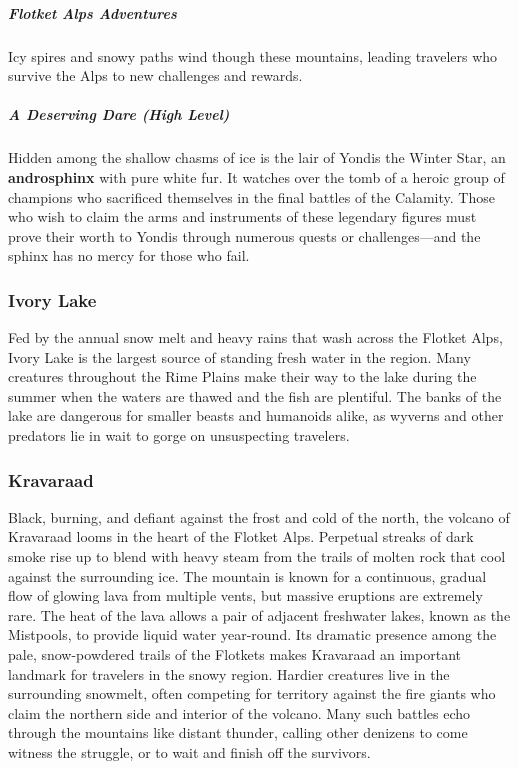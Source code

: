 \documentclass[10pt,a4paper,twoside,bg=print,twocolumn,openany,nodeprecatedcode]{dndbook}
\begin{document}
\subparagraph{Flotket Alps Adventures}
Icy spires and snowy paths wind though these mountains, leading travelers who survive the Alps to new challenges and rewards.

\subparagraph{A Deserving Dare (High Level)}
Hidden among the shallow chasms of ice is the lair of Yondis the Winter Star, an \textbf{androsphinx} with pure white fur. It watches over the tomb of a heroic group of champions who sacrificed themselves in the final battles of the Calamity. Those who wish to claim the arms and instruments of these legendary figures must prove their worth to Yondis through numerous quests or challenges—and the sphinx has no mercy for those who fail.

\subsubsection{Ivory Lake}
Fed by the annual snow melt and heavy rains that wash across the Flotket Alps, Ivory Lake is the largest source of standing fresh water in the region. Many creatures throughout the Rime Plains make their way to the lake during the summer when the waters are thawed and the fish are plentiful. The banks of the lake are dangerous for smaller beasts and humanoids alike, as wyverns and other predators lie in wait to gorge on unsuspecting travelers.

\subsubsection{Kravaraad}
Black, burning, and defiant against the frost and cold of the north, the volcano of Kravaraad looms in the heart of the Flotket Alps. Perpetual streaks of dark smoke rise up to blend with heavy steam from the trails of molten rock that cool against the surrounding ice. The mountain is known for a continuous, gradual flow of glowing lava from multiple vents, but massive eruptions are extremely rare. The heat of the lava allows a pair of adjacent freshwater lakes, known as the Mistpools, to provide liquid water year-round. Its dramatic presence among the pale, snow-powdered trails of the Flotkets makes Kravaraad an important landmark for travelers in the snowy region. Hardier creatures live in the surrounding snowmelt, often competing for territory against the fire giants who claim the northern side and interior of the volcano. Many such battles echo through the mountains like distant thunder, calling other denizens to come witness the struggle, or to wait and finish off the survivors.
\end{document}
